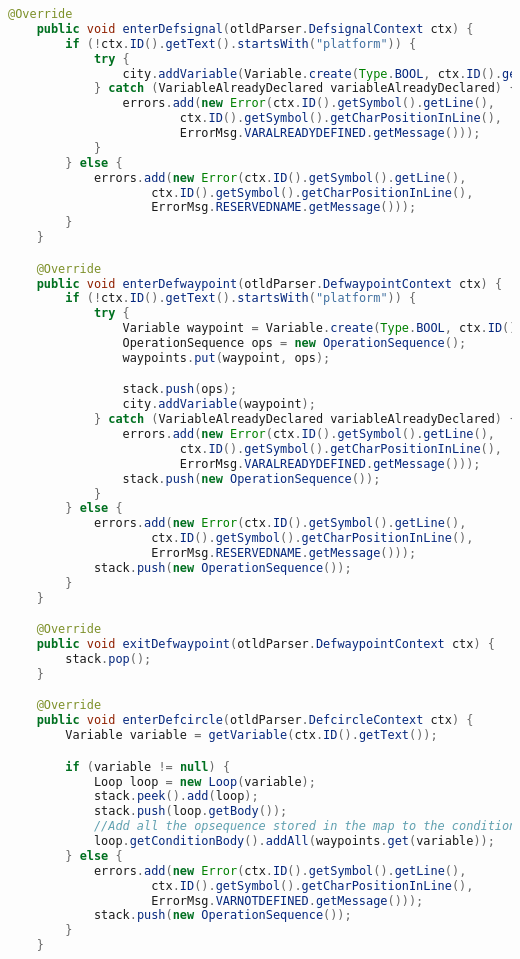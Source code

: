 \begin{landscape}
\begin{lstlisting}[language=Java]
    @Override
    public void enterDefsignal(otldParser.DefsignalContext ctx) {
        if (!ctx.ID().getText().startsWith("platform")) {
            try {
                city.addVariable(Variable.create(Type.BOOL, ctx.ID().getText(), "false"));
            } catch (VariableAlreadyDeclared variableAlreadyDeclared) {
                errors.add(new Error(ctx.ID().getSymbol().getLine(),
                        ctx.ID().getSymbol().getCharPositionInLine(),
                        ErrorMsg.VARALREADYDEFINED.getMessage()));
            }
        } else {
            errors.add(new Error(ctx.ID().getSymbol().getLine(),
                    ctx.ID().getSymbol().getCharPositionInLine(),
                    ErrorMsg.RESERVEDNAME.getMessage()));
        }
    }

    @Override
    public void enterDefwaypoint(otldParser.DefwaypointContext ctx) {
        if (!ctx.ID().getText().startsWith("platform")) {
            try {
                Variable waypoint = Variable.create(Type.BOOL, ctx.ID().getText(), "false");
                OperationSequence ops = new OperationSequence();
                waypoints.put(waypoint, ops);

                stack.push(ops);
                city.addVariable(waypoint);
            } catch (VariableAlreadyDeclared variableAlreadyDeclared) {
                errors.add(new Error(ctx.ID().getSymbol().getLine(),
                        ctx.ID().getSymbol().getCharPositionInLine(),
                        ErrorMsg.VARALREADYDEFINED.getMessage()));
                stack.push(new OperationSequence());
            }
        } else {
            errors.add(new Error(ctx.ID().getSymbol().getLine(),
                    ctx.ID().getSymbol().getCharPositionInLine(),
                    ErrorMsg.RESERVEDNAME.getMessage()));
            stack.push(new OperationSequence());
        }
    }

    @Override
    public void exitDefwaypoint(otldParser.DefwaypointContext ctx) {
        stack.pop();
    }

    @Override
    public void enterDefcircle(otldParser.DefcircleContext ctx) {
        Variable variable = getVariable(ctx.ID().getText());

        if (variable != null) {
            Loop loop = new Loop(variable);
            stack.peek().add(loop);
            stack.push(loop.getBody());
            //Add all the opsequence stored in the map to the condition body of the loop
            loop.getConditionBody().addAll(waypoints.get(variable));
        } else {
            errors.add(new Error(ctx.ID().getSymbol().getLine(),
                    ctx.ID().getSymbol().getCharPositionInLine(),
                    ErrorMsg.VARNOTDEFINED.getMessage()));
            stack.push(new OperationSequence());
        }
    }


\end{lstlisting}
\end{landscape}
